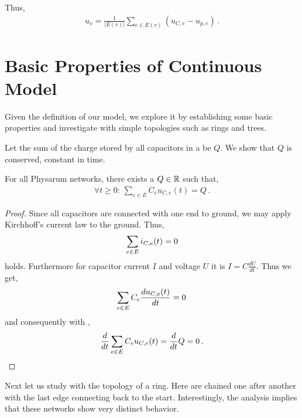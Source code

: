 Thus,
\begin{align}
  u_v = \frac{1}{|E(v)|}\sum_{e \in E(v)}(u_{C,e}-u_{p,e})\,.\label{eq:uv}
\end{align}


\section{Basic Properties of Continuous Model}\label{sec:basic_cont}

  Given the definition of our model, we explore it by establishing some basic properties and investigate \Pns with simple topologies such as rings and trees.

  Let the sum of the charge stored by all capacitors in a \Pn be $Q$. We show that $Q$ is conserved, \ie constant in time.

\begin{lem}\label{lem:inv_cont}
For all Physarum networks, there exists a $Q \in \mathbb{R}$ such that,
\begin{align}
\forall t\ge 0:\,\sum_{e \in E}C_e u_{C,e}(t) = Q\,.
\end{align}
\end{lem}
\begin{proof}
Since all capacitors are connected with one end to ground, we may apply Kirchhoff's current law to the ground.
Thus,  
\begin{align}
\sum_{e \in E}i_{C,e}(t) = 0\notag
\end{align}
holds. Furthermore for capacitor current $I$ and voltage $U$ it is $I= C \frac{dU}{dt}$. Thus we get,
\begin{align}
\sum_{e \in E}C_e\frac{du_{C,e}(t)}{dt} = 0\,\notag
\end{align}
and consequently with ,
\begin{align}
\frac{d}{dt}\sum_{e \in E}C_eu_{C,e}(t) = \frac{d}{dt} Q = 0\,.\notag
\end{align}
\end{proof}

Next let us study \Pns with the topology of a ring. Here \Pes are chained one after another with the last edge connecting back to the start. Interestingly, the analysis implies that these networks show very distinct behavior. 

